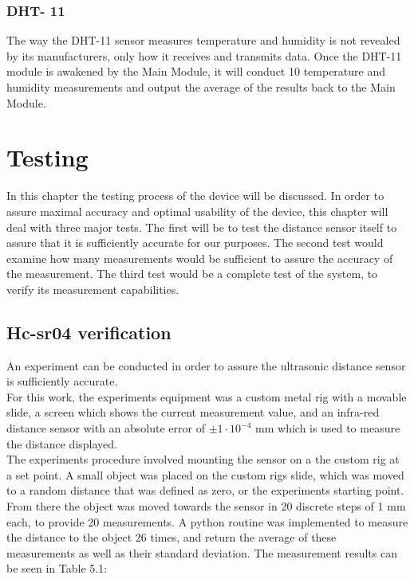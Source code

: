 \documentclass[twoside]{ctuthesis}
\theoremstyle{plain}
\theoremstyle{definition}
\theoremstyle{note}
\begin{document}
\subsection{DHT- 11}
The way the DHT-11 sensor measures temperature and humidity is not revealed by its manufacturers, only how it receives and transmits data. Once the DHT-11 module is awakened by the Main Module, it will conduct 10 temperature and humidity measurements and output the average of the results back to the Main Module.

\newpage

\pagebreak

\begingroup
\renewcommand{\cleardoublepage}{}
\renewcommand{\clearpage}{}
\chapter{Testing}
\endgroup
In this chapter the testing process of the device will be discussed. In order to assure maximal accuracy and optimal usability of the device, this chapter will deal with three major tests. The first will be to test the distance sensor itself to assure that it is sufficiently accurate for our purposes. The second test would examine how many measurements would be sufficient to assure the accuracy of the measurement. The third test would be a complete test of the system, to verify its measurement capabilities.

\section{Hc-sr04 verification}
An experiment can be conducted in order to assure the ultrasonic distance sensor is sufficiently accurate.\\
For this work, the experiments equipment was a custom metal rig with a movable slide, a screen which shows the current measurement value, and an infra-red distance sensor with an absolute error of $\pm1\cdot10^{-4}$ mm which is used to measure the distance displayed.\\
The experiments procedure involved mounting the sensor on a the custom rig at a set point. A small object was placed on the custom rigs slide, which was moved to a random distance that was defined as zero, or the experiments starting point. From there the object was moved towards the sensor in 20 discrete steps of 1 mm each, to provide 20 measurements. A python routine was implemented to measure the distance to the object 26 times, and return the average of these measurements as well as their standard deviation. The measurement results can be seen in Table 5.1:
\end{document}
